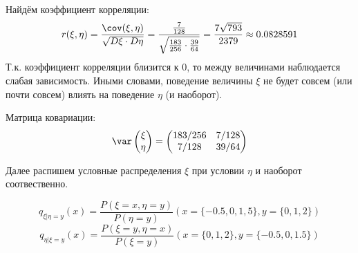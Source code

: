 \begin{enumerate}
	Найдём коэффициент корреляции:
	\[ r(\xi, \eta) = \frac{\cov (\xi, \eta)}{\sqrt{D\xi \cdot D\eta}} = \frac{\frac{7}{128}}{\sqrt{\frac{183}{256} \cdot \frac{39}{64}}} = \frac{7 \sqrt{793}}{2379} \approx 0.0828591 \]
	Т.к. коэффициент корреляции близится к 0, то между величинами наблюдается слабая зависимость. Иными словами, поведение величины $\xi$ не будет совсем (или почти совсем) влиять на поведение $\eta$ (и наоборот).
	
	Матрица ковариации:
	\[
	\var \begin{pmatrix} \xi \\ \eta \end{pmatrix} =
	\begin{pmatrix}
	183/256 & 7/128 \\
	7/128 & 39/64
	\end{pmatrix}
	\]
	
	Далее распишем условные распределения $\xi$ при условии $\eta$ и наоборот соотвественно.
	
	\[
	q_{\xi | \eta = y} (x) = \frac{P(\xi = x, \eta = y)}{P(\eta = y)} (x=\{ -0.5, 0, 1,5 \}, y = \{ 0, 1, 2 \})
	\]
	\[
	q_{\eta | \xi = y} (x) = \frac{P(\xi = y, \eta = x)}{P(\xi = y)} (x = \{ 0, 1, 2 \}, y = \{ -0.5, 0, 1.5 \})
	\]
	

\end{enumerate}
